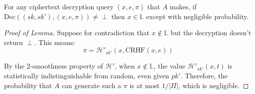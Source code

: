 \begin{lemma}
For any ciphertext decryption query $(x,e,\pi)$ that $A$ makes, if $\text{Dec}((sk,sk'),(x,e,\pi)) \neq \perp$ then $x \in \mathbb{L}$ except with negligible probability.
\end{lemma}

\begin{proof}[Proof of Lemma]
Suppose for contradiction that $x \notin \mathbb{L}$ but the decryption doesn't return $\perp$. This means:
\[ \pi = \mathcal{H}'_{sk'}(x, \text{CRHF}(x,e)) \]

By the 2-smoothness property of $\mathcal{H}'$, when $x \notin \mathbb{L}$, the value $\mathcal{H}'_{sk'}(x,t)$ is statistically indistinguishable from random, even given $pk'$. Therefore, the probability that $A$ can generate such a $\pi$ is at most $1/|\Pi|$, which is negligible.
\end{proof}

